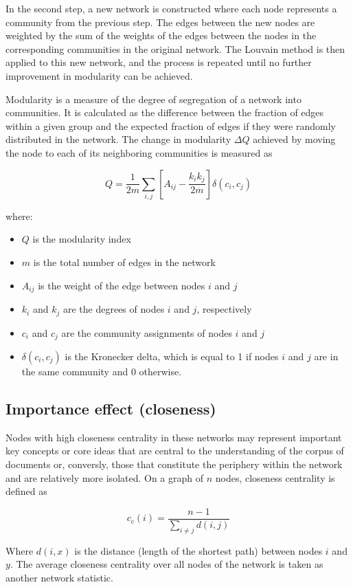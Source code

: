 In the second step, a new network is constructed where each node represents a community from the 
previous step. The edges between the new nodes are weighted by the sum of the weights of the edges 
between the nodes in the corresponding communities in the original network. The Louvain method is then 
applied to this new network, and the process is repeated until no further improvement in modularity 
can be achieved.

Modularity is a measure of the degree of segregation of a network into communities. It is calculated 
as the difference between the fraction of edges within a given group and the expected fraction of 
edges if they were randomly distributed in the network. The change in modularity $\Delta Q$ achieved 
by moving the node to each of its neighboring communities is measured as

$$
Q = \frac{1}{2m}\sum_{i,j}[A_{ij} - \frac{k_ik_j}{2m}]\delta(c_i,c_j)
$$

where:
\begin{itemize}
    \item $Q$ is the modularity index
    \item $m$ is the total number of edges in the network
    \item $A_{ij}$ is the weight of the edge between nodes $i$ and $j$
    \item $k_i$ and $k_j$ are the degrees of nodes $i$ and $j$, respectively
    \item $c_i$ and $c_j$ are the community assignments of nodes $i$ and $j$
    \item $\delta(c_i,c_j)$ is the Kronecker delta, which is equal to 1 if nodes $i$ and $j$ are in the same community and 0 otherwise.
\end{itemize}

\subsection{Importance effect (closeness)}

Nodes with high closeness centrality in these networks may represent important key concepts or core ideas that are central to the understanding of the corpus of documents or, conversly, those that constitute the periphery within the network and are relatively more isolated. On a graph of $n$ nodes, closeness centrality is defined as

$$
c_c(i) = \frac{n - 1}{\sum\limits_{i \ne j} d(i, j)}
$$

Where $d(i,x)$ is the distance (length of the shortest path) between nodes $i$ and $y$. The average closeness centrality over all nodes of the network is taken as another network statistic. 

